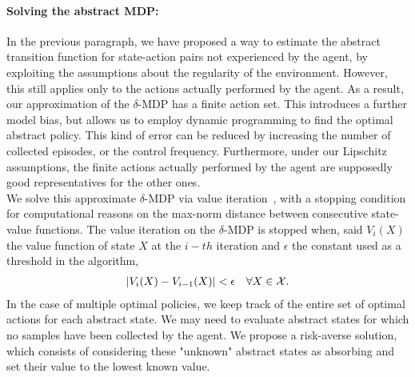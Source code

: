 \paragraph{Solving the abstract MDP:}
In the previous paragraph, we have proposed a way to estimate the abstract transition function for state-action pairs not experienced by the agent, by exploiting the assumptions about the regularity of the environment. However, this still applies only to the actions actually performed by the agent. As a result, our approximation of the $\delta$-\ac{MDP} has a finite action set. This introduces a further model bias, but allows us to employ dynamic programming to find the optimal abstract policy. This kind of error can be reduced by increasing the number of collected episodes, or the control frequency. Furthermore, under our Lipschitz assumptions, the finite actions actually performed by the agent are supposedly good representatives for the other ones.\\
\newline
We solve this approximate $\delta$-\ac{MDP} via value iteration~\citep{bertsekas1996neuro}, with a stopping condition for computational reasons on the max-norm distance between consecutive state-value functions.
The value iteration on the $\delta$-\ac{MDP} is stopped when, said $V_i(X)$ the value function of state $X$ at the $i-th$ iteration and $\epsilon$ the constant used as a threshold in the algorithm, 
\begin{align}
|V_i(X) - V_{i-1}(X)| < \epsilon \quad \forall X \in \mathcal{X}.
\end{align}
In the case of multiple optimal policies, we keep track of the entire set of optimal actions for each abstract state.
We may need to evaluate abstract states for which no samples have been collected by the agent. We propose a risk-averse solution, which consists of considering these "unknown" abstract states as absorbing and set their value to the lowest known value. 

